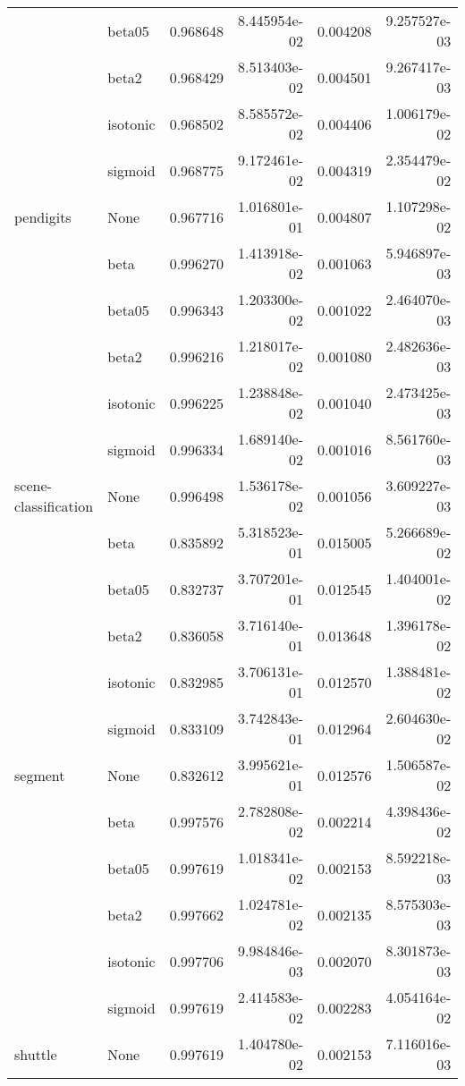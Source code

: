 \begin{tabular}{llrrrr}
        & beta05 &  0.968648 &  8.445954e-02 &  0.004208 &  9.257527e-03 \\
        & beta2 &  0.968429 &  8.513403e-02 &  0.004501 &  9.267417e-03 \\
        & isotonic &  0.968502 &  8.585572e-02 &  0.004406 &  1.006179e-02 \\
        & sigmoid &  0.968775 &  9.172461e-02 &  0.004319 &  2.354479e-02 \\
pendigits & None &  0.967716 &  1.016801e-01 &  0.004807 &  1.107298e-02 \\
        & beta &  0.996270 &  1.413918e-02 &  0.001063 &  5.946897e-03 \\
        & beta05 &  0.996343 &  1.203300e-02 &  0.001022 &  2.464070e-03 \\
        & beta2 &  0.996216 &  1.218017e-02 &  0.001080 &  2.482636e-03 \\
        & isotonic &  0.996225 &  1.238848e-02 &  0.001040 &  2.473425e-03 \\
        & sigmoid &  0.996334 &  1.689140e-02 &  0.001016 &  8.561760e-03 \\
scene-classification & None &  0.996498 &  1.536178e-02 &  0.001056 &  3.609227e-03 \\
        & beta &  0.835892 &  5.318523e-01 &  0.015005 &  5.266689e-02 \\
        & beta05 &  0.832737 &  3.707201e-01 &  0.012545 &  1.404001e-02 \\
        & beta2 &  0.836058 &  3.716140e-01 &  0.013648 &  1.396178e-02 \\
        & isotonic &  0.832985 &  3.706131e-01 &  0.012570 &  1.388481e-02 \\
        & sigmoid &  0.833109 &  3.742843e-01 &  0.012964 &  2.604630e-02 \\
segment & None &  0.832612 &  3.995621e-01 &  0.012576 &  1.506587e-02 \\
        & beta &  0.997576 &  2.782808e-02 &  0.002214 &  4.398436e-02 \\
        & beta05 &  0.997619 &  1.018341e-02 &  0.002153 &  8.592218e-03 \\
        & beta2 &  0.997662 &  1.024781e-02 &  0.002135 &  8.575303e-03 \\
        & isotonic &  0.997706 &  9.984846e-03 &  0.002070 &  8.301873e-03 \\
        & sigmoid &  0.997619 &  2.414583e-02 &  0.002283 &  4.054164e-02 \\
shuttle & None &  0.997619 &  1.404780e-02 &  0.002153 &  7.116016e-03 \\

\end{tabular}
